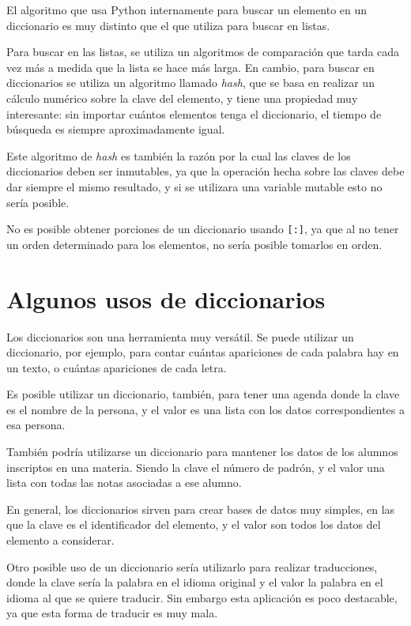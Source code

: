 \begin{sabias_que}
El algoritmo que usa Python internamente para buscar un elemento en un
diccionario es muy distinto que el que utiliza para buscar en listas.

Para buscar en las listas, se utiliza un algoritmos de comparación que
tarda cada vez más a medida que la lista se hace más larga.  En cambio,
para buscar en diccionarios se utiliza un algoritmo llamado {\it hash},
que se basa en realizar un cálculo numérico sobre la clave del elemento, 
y tiene una propiedad muy interesante: sin importar cuántos elementos
tenga el diccionario, el tiempo de búsqueda es siempre aproximadamente
igual.

Este algoritmo de {\it hash} es también la razón por la cual las claves de
los diccionarios deben ser inmutables, ya que la operación hecha sobre las
claves debe dar siempre el mismo resultado, y si se utilizara una variable
mutable esto no sería posible.
\end{sabias_que}

No es posible obtener porciones de un diccionario usando \lstinline![:]!,
ya que al no tener un orden determinado para los elementos, no sería
posible tomarlos en orden.

\section{Algunos usos de diccionarios}

Los diccionarios son una herramienta muy versátil.  Se puede utilizar un
diccionario, por ejemplo, para contar cuántas apariciones de cada palabra
hay en un texto, o cuántas apariciones de cada letra.  

Es posible utilizar un diccionario, también, para tener una agenda donde la
clave es el nombre de la persona, y el valor es una lista con los datos
correspondientes a esa persona.

También podría utilizarse un diccionario para mantener los datos de los
alumnos inscriptos en una materia.  Siendo la clave el número de padrón, y
el valor una lista con todas las notas asociadas a ese alumno.

En general, los diccionarios sirven para crear bases de datos muy simples,
en las que la clave es el identificador del elemento, y el valor son todos
los datos del elemento a considerar.

Otro posible uso de un diccionario sería utilizarlo para realizar
traducciones, donde la clave sería la palabra en el idioma original y el
valor la palabra en el idioma al que se quiere traducir.  Sin embargo esta
aplicación es poco destacable, ya que esta forma de traducir es muy mala.

